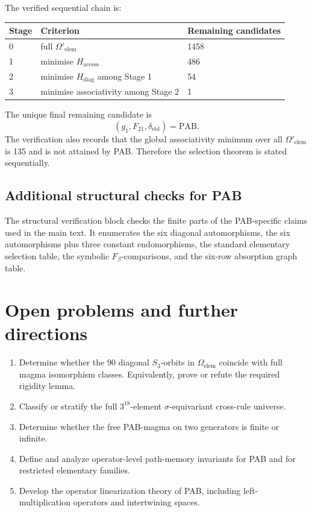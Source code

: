 \documentclass[11pt]{article}
\begin{document}
The verified sequential chain is:
\begin{center}
\small
\begin{tabular}{@{}lll@{}}
\toprule
Stage & Criterion & Remaining candidates \\
\midrule
0 & full \(\Omega'_{\mathrm{elem}}\) & 1458 \\
1 & minimise \(H_{\mathrm{access}}\) & 486 \\
2 & minimise \(H_{\mathrm{diag}}\) among Stage 1 & 54 \\
3 & minimise associativity among Stage 2 & 1 \\
\bottomrule
\end{tabular}
\end{center}
The unique final remaining candidate is
\[
(g_1,F_{21},\delta_{\mathrm{std}})=\mathrm{PAB}.
\]
The verification also records that the global associativity minimum over all
\(\Omega'_{\mathrm{elem}}\) is 135 and is not attained by PAB. Therefore the
selection theorem is stated sequentially.

\subsection{Additional structural checks for PAB}

The structural verification block checks the finite parts of the PAB-specific
claims used in the main text. It enumerates the six diagonal automorphisms, the
six automorphisms plus three constant endomorphisms, the standard elementary
selection table, the symbolic \(F_\beta\)-comparisons, and the six-row
absorption graph table.

\section{Open problems and further directions}
\begin{enumerate}[leftmargin=2.2em,itemsep=0.35em]
\item Determine whether the 90 diagonal \(S_3\)-orbits in
\(\Omega_{\mathrm{elem}}\) coincide with full magma isomorphism classes.
Equivalently, prove or refute the required rigidity lemma.
\item Classify or stratify the full \(3^{18}\)-element \(\sigma\)-equivariant
cross-rule universe.
\item Determine whether the free PAB-magma on two generators is finite or
infinite.
\item Define and analyze operator-level path-memory invariants for PAB and for
restricted elementary families.
\item Develop the operator linearization theory of PAB, including left-multiplication
operators and intertwining spaces.
\end{enumerate}
\end{document}
